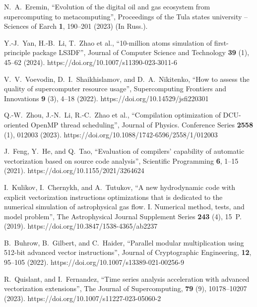 \documentclass[
11pt,%
tightenlines,%
twoside,%
onecolumn,%
nofloats,%
nobibnotes,%
nofootinbib,%
superscriptaddress,%
noshowpacs,%
centertags]%
{revtex4}
\begin{document}
\begin{thebibliography}{99}
N.~A.~Eremin, \textquotedblleft Evolution of the digital oil and gas ecosystem from supercomputing to metacomputing\textquotedblright, Proceedings of the Tula states university -- Sciences of Earch \textbf{1}, 190--201 (2023) (In Russ.).

Y.-J.~Yan, H.-B.~Li, T.~Zhao et al., \textquotedblleft 10-million atoms simulation of first-principle package LS3DF\textquotedblright, Journal of Computer Science and Technology \textbf{39} (1), 45--62 (2024). https://doi.org/10.1007/s11390-023-3011-6

V.~V.~Voevodin, D.~I.~Shaikhislamov, and D.~A.~Nikitenko, \textquotedblleft How to assess the quality of supercomputer resource usage\textquotedblright, Supercomputing Frontiers and Innovations \textbf{9} (3), 4--18 (2022). https://doi.org/10.14529/jsfi220301

Q.-W.~Zhou, J.-N.~Li, R.-C.~Zhao et al., \textquotedblleft Compilation optimization of DCU-oriented OpenMP thread scheduling\textquotedblright, Journal of Physics. Conference Series \textbf{2558} (1), 012003 (2023). https://doi.org/10.1088/1742-6596/2558/1/012003

J.~Feng, Y.~He, and Q.~Tao, \textquotedblleft Evaluation of compilers’ capability of automatic vectorization based on source code analysis\textquotedblright, Scientific Programming \textbf{6}, 1--15 (2021). https://doi.org/10.1155/2021/3264624


I.~Kulikov, I.~Chernykh, and A.~Tutukov, \textquotedblleft A new hydrodynamic code with explicit vectorization instructions optimizations that is dedicated to the numerical simulation of astrophysical gas flow. I. Numerical method, tests, and model problem\textquotedblright, The Astrophysical Journal Supplement Series \textbf{243} (4), 15~P. (2019). https://doi.org/10.3847/1538-4365/ab2237

B.~Buhrow, B.~Gilbert, and C.~Haider, \textquotedblleft Parallel modular multiplication using 512-bit advanced vector instructions\textquotedblright, Journal of Cryptographic Engineering, \textbf{12}, 95--105 (2022). https://doi.org/10.1007/s13389-021-00256-9

R.~Quislant, and I.~Fernandez, \textquotedblleft Time series analysis acceleration with advanced vectorization extensions\textquotedblright, The Journal of Supercomputing, \textbf{79} (9), 10178--10207 (2023). https://doi.org/10.1007/s11227-023-05060-2


\end{thebibliography}
\end{document}
